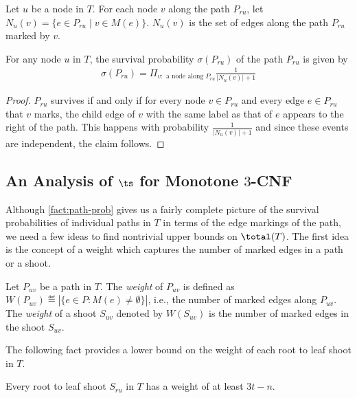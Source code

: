 \begin{definition}
Let $u$ be a node in $T$. For each node $v$ 
along the path $P_{ru}$, let $N_u(v) = \{e\in P_{ru} \mid v\in M(e)\}$.
$N_u(v)$ is the set of edges along the path $P_{ru}$ marked by $v$.
\end{definition}

\begin{fact}
\label{fact:path-prob}
For any node $u$ in $T$,
the survival probability $\sigma(P_{ru})$ of the path $P_{ru}$
is given by 
\begin{align*}
\sigma(P_{ru}) = \Pi_{v: \text{ a node along }  P_{ru}} \frac{1}{|N_u(v)|+1}
\end{align*}
\end{fact}

\begin{proof}
$P_{ru}$ survives if and only if for every node $v \in P_{ru}$ and every 
edge $e \in P_{ru}$ that $v$ marks, 
the child edge of $v$ with the same label as that of $e$ appears to the right of the path. This happens with probability $\frac{1}{|N_u(v)| + 1}$ and since these events are independent, the claim follows.
\end{proof}


\subsection{An Analysis of $\ts$ for Monotone $3$-CNF}


Although \cref{fact:path-prob} gives us a fairly complete picture of 
the survival probabilities of individual paths in $T$ in terms of the edge
markings of the path,  we need a few ideas to find nontrivial upper bounds on $\total(T)$.
The first idea is the concept of a weight which captures the number of 
marked edges in a path or a shoot. 

\begin{definition}[Weight]
Let $P_{uv}$ be a path in $T$. 
The \emph{weight} of $P_{uv}$ is defined as 
$W(P_{uv}) \eqdef |\{e \in P: M(e) \ne \emptyset \}|$, 
i.e., the number of marked edges along $P_{uv}$. 
The \emph{weight} of a shoot $S_{uv}$ denoted by $W(S_{uv})$ is the number of marked edges 
in the shoot $S_{uv}$.

\end{definition}

The following fact provides a lower bound on the weight of each root to leaf
shoot  in $T$.

\begin{fact}
\label{fact:shoot-extended-weight-lower-bound}
Every root to leaf shoot $S_{ru}$ in $T$ has a weight of
at least $3t - n$.
\end{fact}


